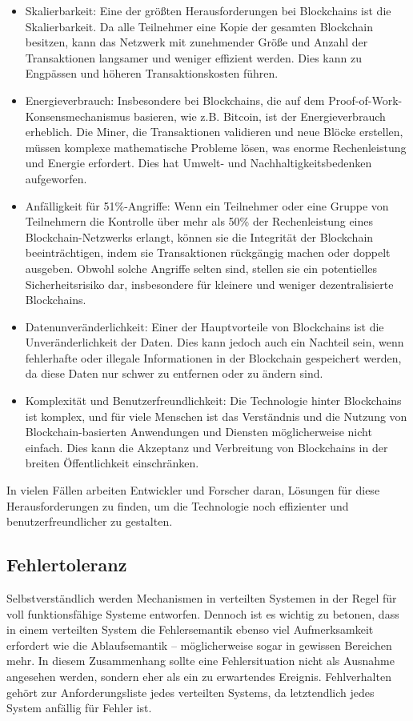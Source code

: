 \begin{itemize}
\item Skalierbarkeit: Eine der größten Herausforderungen bei Blockchains ist die Skalierbarkeit. Da alle Teilnehmer eine Kopie der gesamten Blockchain besitzen, kann das Netzwerk mit zunehmender Größe und Anzahl der Transaktionen langsamer und weniger effizient werden. Dies kann zu Engpässen und höheren Transaktionskosten führen.
\item Energieverbrauch: Insbesondere bei Blockchains, die auf dem Proof-of-Work-Konsensmechanismus basieren, wie z.B. Bitcoin, ist der Energieverbrauch erheblich. Die Miner, die Transaktionen validieren und neue Blöcke erstellen, müssen komplexe mathematische Probleme lösen, was enorme Rechenleistung und Energie erfordert. Dies hat Umwelt- und Nachhaltigkeitsbedenken aufgeworfen.
\item Anfälligkeit für 51\%-Angriffe: Wenn ein Teilnehmer oder eine Gruppe von Teilnehmern die Kontrolle über mehr als 50\% der Rechenleistung eines Blockchain-Netzwerks erlangt, können sie die Integrität der Blockchain beeinträchtigen, indem sie Transaktionen rückgängig machen oder doppelt ausgeben. Obwohl solche Angriffe selten sind, stellen sie ein potentielles Sicherheitsrisiko dar, insbesondere für kleinere und weniger dezentralisierte Blockchains.
\item Datenunveränderlichkeit: Einer der Hauptvorteile von Blockchains ist die Unveränderlichkeit der Daten. Dies kann jedoch auch ein Nachteil sein, wenn fehlerhafte oder illegale Informationen in der Blockchain gespeichert werden, da diese Daten nur schwer zu entfernen oder zu ändern sind.
\item Komplexität und Benutzerfreundlichkeit: Die Technologie hinter Blockchains ist komplex, und für viele Menschen ist das Verständnis und die Nutzung von Blockchain-basierten Anwendungen und Diensten möglicherweise nicht einfach. Dies kann die Akzeptanz und Verbreitung von Blockchains in der breiten Öffentlichkeit einschränken.
\end{itemize}
In vielen Fällen arbeiten Entwickler und Forscher daran, Lösungen für diese Herausforderungen zu finden, um die Technologie noch effizienter und benutzerfreundlicher zu gestalten.

\subsection{Fehlertoleranz}

Selbstverständlich werden Mechanismen in verteilten Systemen in der Regel für voll funktionsfähige Systeme entworfen. Dennoch ist es wichtig zu betonen, dass in einem verteilten System die Fehlersemantik ebenso viel Aufmerksamkeit erfordert wie die Ablaufsemantik – möglicherweise sogar in gewissen Bereichen mehr. In diesem Zusammenhang sollte eine Fehlersituation nicht als Ausnahme angesehen werden, sondern eher als ein zu erwartendes Ereignis. Fehlverhalten gehört zur Anforderungsliste jedes verteilten Systems, da letztendlich jedes System anfällig für Fehler ist.

